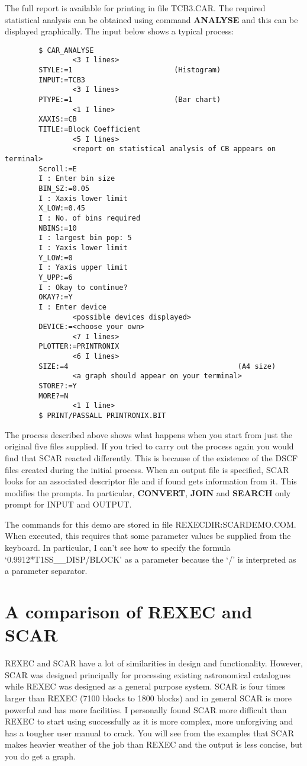 The full report is available for printing in file TCB3.CAR.
The required statistical analysis can be obtained using command {\bf ANALYSE}
and this can be displayed graphically.
The input below shows a typical process:
\begin{verbatim}
        $ CAR_ANALYSE
                <3 I lines>
        STYLE:=1                        (Histogram)
        INPUT:=TCB3
                <3 I lines>
        PTYPE:=1                        (Bar chart)
                <1 I line>
        XAXIS:=CB
        TITLE:=Block Coefficient
                <5 I lines>
                <report on statistical analysis of CB appears on terminal>
        Scroll:=E
        I : Enter bin size
        BIN_SZ:=0.05
        I : Xaxis lower limit
        X_LOW:=0.45
        I : No. of bins required
        NBINS:=10
        I : largest bin pop: 5
        I : Yaxis lower limit
        Y_LOW:=0
        I : Yaxis upper limit
        Y_UPP:=6
        I : Okay to continue?
        OKAY?:=Y
        I : Enter device
                <possible devices displayed>
        DEVICE:=<choose your own>
                <7 I lines>
        PLOTTER:=PRINTRONIX
                <6 I lines>
        SIZE:=4                                        (A4 size)
                <a graph should appear on your terminal>
        STORE?:=Y
        MORE?=N
                <1 I line>
        $ PRINT/PASSALL PRINTRONIX.BIT
\end{verbatim}
The process described above shows what happens when you start from just the
original five files supplied.
If you tried to carry out the process again you would find that SCAR reacted
differently.
This is because of the existence of the DSCF files created during the initial
process.
When an output file is specified, SCAR looks for an associated descriptor file
and if found gets information from it.
This modifies the prompts.
In particular, {\bf CONVERT}, {\bf JOIN} and {\bf SEARCH} only prompt for
INPUT and OUTPUT.

The commands for this demo are stored in file REXECDIR:SCARDEMO.COM.
When executed, this requires that some parameter values be supplied from the
keyboard.
In particular, I can't see how to specify the formula
`0.9912*T1SS\_\_DISP/BLOCK' as a parameter because the `/' is interpreted as a
parameter separator.
\section {A comparison of REXEC and SCAR}
REXEC and SCAR have a lot of similarities in design and functionality.
However, SCAR was designed principally for processing existing astronomical
catalogues while REXEC was designed as a general purpose system.
SCAR is four times larger than REXEC (7100 blocks to 1800 blocks) and in general
SCAR is more powerful and has more facilities.
I personally found SCAR more difficult than REXEC to start using successfully
as it is more complex, more unforgiving and has a tougher user manual to crack.
You will see from the examples that SCAR makes heavier weather of the job than
REXEC and the output is less concise, but you do get a graph.

